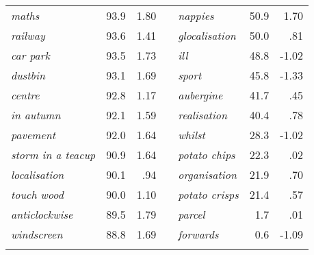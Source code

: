 \documentclass[output=paper]{langsci/langscibook}
\begin{document}
\begin{table}[h]
{\begin{tabular}{lrr p{1cm} lrr}
\textit{maths} & 93.9 & 1.80 &  & \textit{nappies} & 50.9 & 1.70\\
\textit{railway} & 93.6 & 1.41 &  & \textit{glocalisation} & 50.0 & .81\\
\textit{car park} & 93.5 & 1.73 &  & \textit{ill} & 48.8 & -1.02\\
\textit{dustbin} & 93.1 & 1.69 &  & \textit{sport} & 45.8 & -1.33\\
\textit{centre} & 92.8 & 1.17 &  & \textit{aubergine} & 41.7 & .45\\
\textit{in autumn} & 92.1 & 1.59 &  & \textit{realisation} & 40.4 & .78\\
\textit{pavement} & 92.0 & 1.64 &  & \textit{whilst} & 28.3 & -1.02\\
\textit{storm in a teacup} & 90.9 & 1.64 &  & \textit{potato chips} & 22.3 & .02\\
\textit{localisation} & 90.1 & .94 &  & \textit{organisation} & 21.9 & .70\\
\textit{touch wood} & 90.0 & 1.10 &  & \textit{potato crisps} & 21.4 & .57\\
\textit{anticlockwise} & 89.5 & 1.79 &  & \textit{parcel} & 1.7 & .01\\
\textit{windscreen} & 88.8 & 1.69 &  & \textit{forwards} & 0.6 & -1.09\\
\lspbottomrule
\end{tabular}
}
 \label{tab:krug:app3}
\end{table}
 

\sloppy
\clearpage
\printbibliography[heading=subbibliography,notkeyword=this] 
\end{document}

